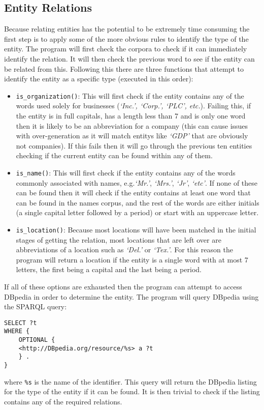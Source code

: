 \documentclass[draft]{article}
\begin{document}
\begin{multicols*}{2}
\section*{Entity Relations}
Because relating entities has the potential to be extremely time consuming the first step is to apply some of the more obvious rules to identify the type of the entity. The program will first check the corpora to check if it can immediately identify the relation. It will then check the previous word to see if the entity can be related from this. Following this there are three functions that attempt to identify the entity as a specific type (executed in this order):
\begin{itemize}
\item \texttt{is\_organization()}: This will first check if the entity contains any of the words used solely for businesses (\textit{`Inc.', `Corp.', `PLC', etc.}). Failing this, if the entity is in full capitals, has a length less than 7 and is only one word then it is likely to be an abbreviation for a company (this can cause issues with over-generation as it will match entitys like \textit{`GDP'} that are obviously not companies). If this fails then it will go through the previous ten entities checking if the current entity can be found within any of them.
\item \texttt{is\_name()}: This will first check if the entity contains any of the words commonly associated with names, e.g.\textit{`Mr.'}, \textit{`Mrs.'}, \textit{`Jr'}, \textit{`etc'}. If none of these can be found then it will check if the entity contains at least one word that can be found in the names corpus, and the rest of the words are either initials (a single capital letter followed by a period) or start with an uppercase letter.
\item \texttt{is\_location()}: Because most locations will have been matched in the initial stages of getting the relation, most locations that are left over are abbreviations of a location such as \textit{`Del.'} or \textit{`Tex.'}. For this reason the program will return a location if the entity is a single word with at most 7 letters, the first being a capital and the last being a period. 
\end{itemize}

If all of these options are exhausted then the program can attempt to access DBpedia in order to determine the entity. The program will query DBpedia using the SPARQL \citep{SPARQL} query:
\begin{verbatim}
SELECT ?t
WHERE {
	OPTIONAL { 
	<http://DBpedia.org/resource/%s> a ?t 
	} .
}
\end{verbatim}
where \texttt{\%s} is the name of the identifier. This query will return the DBpedia listing for the type of the entity if it can be found. It is then trivial to check if the listing contains any of the required relations. 


\end{multicols*}
\end{document}
